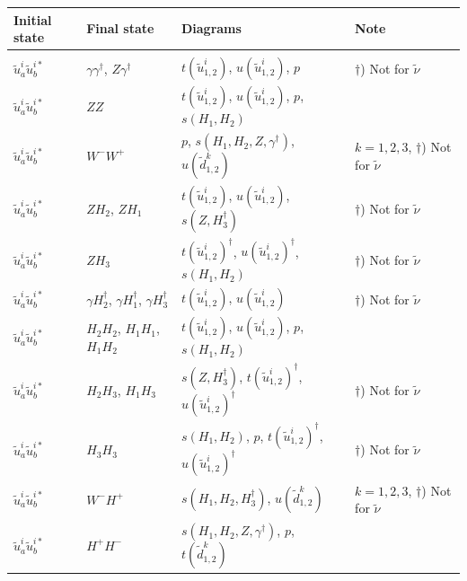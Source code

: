 \documentclass[a4paper,10pt,oneside]{book}
\newcommand{\tabspace}{\\[-2.5ex]}
\begin{document}
{\small
\begin{center}
\begin{tabular}{llll} \hline
{\bfseries Initial state} & {\bfseries Final state} &
{\bfseries Diagrams} & {\bfseries Note} \\ \hline \tabspace
$\tilde{u}^i_a \tilde{u}^{i*}_{b}$ & $\gamma \gamma^\dagger$, $Z \gamma^\dagger$ &
$t(\tilde{u}^i_{1,2})$, $u(\tilde{u}^i_{1,2})$, $p$
& $\dagger$) Not for $\tilde{\nu}$ \\
$\tilde{u}^i_a\tilde{u}^{i*}_b$ & $Z Z$ &
$t(\tilde{u}^i_{1,2})$, $u(\tilde{u}^i_{1,2})$, $p$, $s(H_{1},H_{2})$ \\
$\tilde{u}^i_a\tilde{u}^{i*}_b$ & $W^-W^+$ &
$p$, $s(H_{1},H_{2},Z,\gamma^\dagger)$, $u(\tilde{d}^k_{1,2})$ 
& \parbox[t]{4cm}{$k=1,2,3$, $\dagger$) Not for $\tilde{\nu}$} \\
$\tilde{u}^i_a\tilde{u}^{i*}_b$ & $Z H_{2}$, $Z H_{1}$ &
$t(\tilde{u}^i_{1,2})$, $u(\tilde{u}^i_{1,2})$, $s(Z,H_3^\dagger)$
& $\dagger$) Not for $\tilde{\nu}$ \\
$\tilde{u}^i_a\tilde{u}^{i*}_b$ & $Z H_{3}$ &
$t(\tilde{u}^i_{1,2})^\dagger$, $u(\tilde{u}^i_{1,2})^\dagger$, $s(H_{1},H_{2})$
& $\dagger$) Not for $\tilde{\nu}$ \\
$\tilde{u}^i_a\tilde{u}^{i*}_b$ & $\gamma H_{2}^\dagger$, $\gamma H_{1}^\dagger$, $\gamma H_{3}^\dagger$ &
$t(\tilde{u}^i_{1,2})$, $u(\tilde{u}^i_{1,2})$ 
& $\dagger$) Not for $\tilde{\nu}$ \\
$\tilde{u}^i_a\tilde{u}^{i*}_b$ & $H_{2} H_{2}$, $H_{1} H_{1}$, 
$H_{1} H_{2}$ &
$t(\tilde{u}^i_{1,2})$, $u(\tilde{u}^i_{1,2})$, $p$, $s(H_{1},H_{2})$ \\
$\tilde{u}^i_a\tilde{u}^{i*}_b$ & $H_{2} H_{3}$, $H_{1} H_{3}$ &
$s(Z,H_3^\dagger)$, $t(\tilde{u}^i_{1,2})^\dagger$, $u(\tilde{u}^i_{1,2})^\dagger$
& $\dagger$) Not for $\tilde{\nu}$ \\
$\tilde{u}^i_a\tilde{u}^{i*}_b$ & $H_{3} H_{3}$ &
$s(H_{1},H_{2})$, $p$, $t(\tilde{u}^i_{1,2})^\dagger$, $u(\tilde{u}^i_{1,2})^\dagger$
& $\dagger$) Not for $\tilde{\nu}$ \\
$\tilde{u}^i_a\tilde{u}^{i*}_b$ & $W^- H^+$ &
$s(H_{1},H_{2},H_3^\dagger)$, $u(\tilde{d}^k_{1,2})$
& \parbox[t]{4cm}{$k=1,2,3$, $\dagger$) Not for $\tilde{\nu}$} \\
$\tilde{u}^i_a\tilde{u}^{i*}_b$ & $H^+ H^-$ &
$s(H_{1},H_{2},Z,\gamma^\dagger)$, $p$, $t(\tilde{d}^k_{1,2})$

\end{tabular}
\end{center}}
\end{document}
